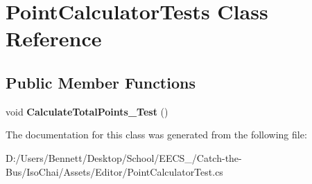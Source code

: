 \hypertarget{class_point_calculator_tests}{}\section{Point\+Calculator\+Tests Class Reference}
\label{class_point_calculator_tests}
\subsection*{Public Member Functions}
\begin{DoxyCompactItemize}
\item 
\mbox{\label{class_point_calculator_tests_a3a5a2e4df8e7c0601b9a313f1c485f61}} 
void {\bfseries Calculate\+Total\+Points\+\_\+\+Test} ()
\end{DoxyCompactItemize}


The documentation for this class was generated from the following file\+:\begin{DoxyCompactItemize}
\item 
D\+:/\+Users/\+Bennett/\+Desktop/\+School/\+E\+E\+C\+S\+\_/\+Catch-\/the-\/\+Bus/\+Iso\+Chai/\+Assets/\+Editor/Point\+Calculator\+Test.\+cs\end{DoxyCompactItemize}
